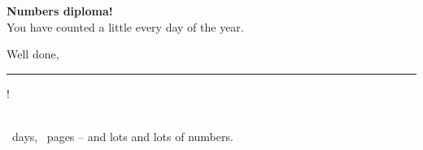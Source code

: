 \begin{center}
\vspace*{3cm}

\medalla{\totaldias}

\vspace{8mm}
{\fontsize{34}{40}\selectfont\bfseries\color{colorLectura} Numbers diploma!}\\[8mm]
{\Large You have counted a little every day of the year.}\\[10mm]
{\Large Well done, \rule{65mm}{0.4pt}!}\\[14mm]
{\large \totaldias\ days, \totaldias\ pages -- and lots and lots of numbers.}
\end{center}
\vspace*{\fill}
\newpage
